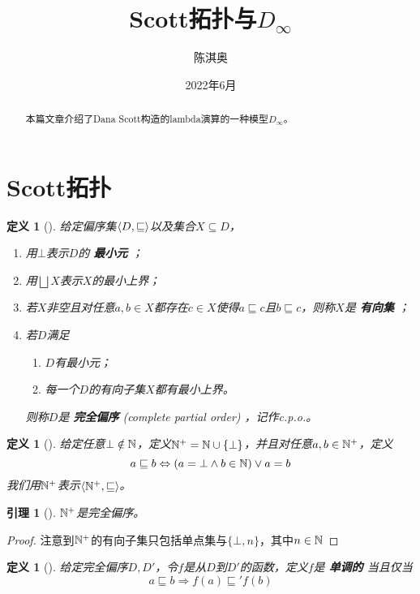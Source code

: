 \documentclass{jams-l}
\author{陈淇奥}
\date{2022年6月}
\title{Scott拓扑与\(D_\infty\)}
\newtheorem{lemma}[theorem]{引理}
\newtheorem{definition}[theorem]{定义}
\begin{document}
\maketitle
\begin{abstract}
本篇文章介绍了Dana Scott构造的lambda演算的一种模型\(D_\infty\)。
\end{abstract}

\section{Scott拓扑}
\label{sec:org84d06df}

\begin{definition}[]
给定偏序集\(\langle D,\sqsubseteq\rangle\)以及集合\(X\subseteq D\)，
\begin{enumerate}
\item 用\(\bot\)表示\(D\)的 \textbf{最小元} ；
\item 用\(\bigsqcup X\)表示\(X\)的最小上界；
\item 若\(X\)非空且对任意\(a,b\in X\)都存在\(c\in X\)使得\(a\sqsubseteq c\)且\(b\sqsubseteq c\)，则称\(X\)是 \textbf{有向集} ；
\item 若\(D\)满足
\begin{enumerate}
\item \(D\)有最小元；
\item 每一个\(D\)的有向子集\(X\)都有最小上界。
\end{enumerate}
则称\(D\)是 \textbf{完全偏序} (complete partial order) ，记作c.p.o.。
\end{enumerate}
\end{definition}

\begin{definition}[]
给定任意\(\bot\notin\mathbb{N}\)，定义\(\mathbb{N}^+=\mathbb{N}\cup\{\bot\}\)，并且对任意\(a,b\in\mathbb{N}^+\)，定义
\begin{equation*}
a\sqsubseteq b\Leftrightarrow(a=\bot\wedge b\in\mathbb{N})\vee a=b
\end{equation*}
我们用\(\mathbb{N}^+\)表示\(\langle\mathbb{N}^+,\sqsubseteq\rangle\)。
\end{definition}

\begin{lemma}[]
\(\mathbb{N}^+\)是完全偏序。
\end{lemma}

\begin{proof}
注意到\(\mathbb{N}^+\)的有向子集只包括单点集与\(\{\bot,n\}\)，其中\(n\in\mathbb{N}\)
\end{proof}

\begin{definition}[]
给定完全偏序\(D,D'\)，令\(f\)是从\(D\)到\(D'\)的函数，定义\(f\)是 \textbf{单调的} 当且仅当
\begin{equation*}
a\sqsubseteq b\Rightarrow f(a)\sqsubseteq'f(b)
\end{equation*}
\end{definition}
\end{document}
